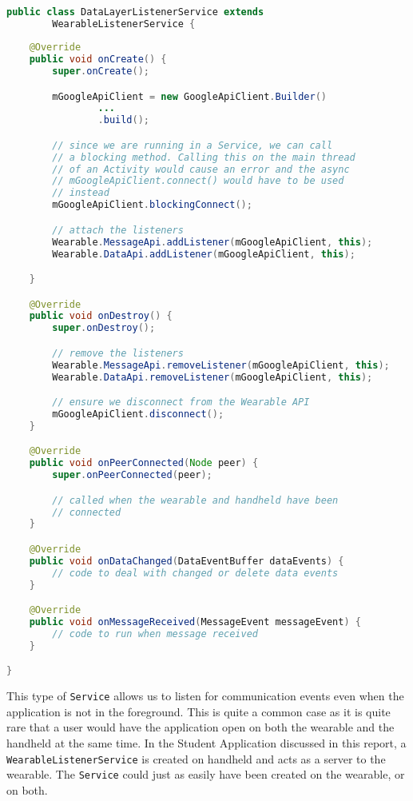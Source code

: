 \begin{lstlisting}[language=Java]

public class DataLayerListenerService extends
        WearableListenerService {
    
    @Override
    public void onCreate() {
        super.onCreate();

        mGoogleApiClient = new GoogleApiClient.Builder()
                ...
                .build();

        // since we are running in a Service, we can call
        // a blocking method. Calling this on the main thread
        // of an Activity would cause an error and the async
        // mGoogleApiClient.connect() would have to be used
        // instead
        mGoogleApiClient.blockingConnect();

        // attach the listeners
        Wearable.MessageApi.addListener(mGoogleApiClient, this);
        Wearable.DataApi.addListener(mGoogleApiClient, this);

    }

    @Override
    public void onDestroy() {
        super.onDestroy();

        // remove the listeners
        Wearable.MessageApi.removeListener(mGoogleApiClient, this);
        Wearable.DataApi.removeListener(mGoogleApiClient, this);

        // ensure we disconnect from the Wearable API
        mGoogleApiClient.disconnect();
    }

    @Override
    public void onPeerConnected(Node peer) {
        super.onPeerConnected(peer);

        // called when the wearable and handheld have been
        // connected
    }

    @Override
    public void onDataChanged(DataEventBuffer dataEvents) {
        // code to deal with changed or delete data events
    }

    @Override
    public void onMessageReceived(MessageEvent messageEvent) {
        // code to run when message received
    }

}

\end{lstlisting}

This type of \texttt{Service} allows us to listen for communication events even
when the application is not in the foreground. This is quite a common case as
it is quite rare that a user would have the application open on both the
wearable and the handheld at the same time. In the Student Application discussed
in this report, a \texttt{WearableListenerService} is created on handheld and
acts as a server to the wearable. The \texttt{Service} could just as easily have
been created on the wearable, or on both.


